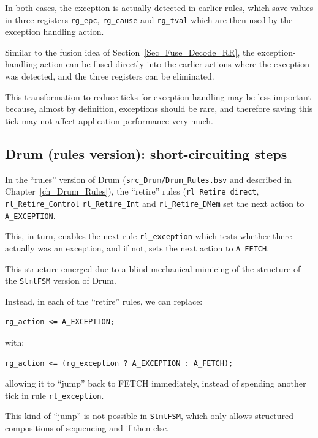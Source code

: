 In both cases, the exception is actually detected in earlier rules,
which save values in three registers \verb|rg_epc|, \verb|rg_cause|
and \verb|rg_tval| which are then used by the exception handling
action.

Similar to the fusion idea of Section~\ref{Sec_Fuse_Decode_RR}, the
exception-handling action can be fused directly into the earlier
actions where the exception was detected, and the three registers can
be eliminated.

This transformation to reduce ticks for exception-handling may be less
important because, almost by definition, exceptions should be rare,
and therefore saving this tick may not affect application performance
very much.


\subsection{Drum (rules version): short-circuiting steps}

In the ``rules'' version of Drum (\verb|src_Drum/Drum_Rules.bsv| and
described in Chapter~\ref{ch_Drum_Rules}), the ``retire'' rules
(\verb|rl_Retire_direct|, \verb|rl_Retire_Control|
\verb|rl_Retire_Int| and \verb|rl_Retire_DMem| set the next action to
\verb|A_EXCEPTION|.

This, in turn, enables the next rule \verb|rl_exception| which tests
whether there actually was an exception, and if not, sets the next
action to \verb|A_FETCH|.

This structure emerged due to a blind mechanical mimicing of the
structure of the \verb|StmtFSM| version of Drum.

Instead, in each of the ``retire'' rules, we can replace:

{\small
\begin{Verbatim}[frame=single]
      rg_action <= A_EXCEPTION;
\end{Verbatim}
}

with:

{\small
\begin{Verbatim}[frame=single]
      rg_action <= (rg_exception ? A_EXCEPTION : A_FETCH);
\end{Verbatim}
}

allowing it to ``jump'' back to FETCH immediately, instead of spending
another tick in rule \verb|rl_exception|.

This kind of ``jump'' is not possible in \verb|StmtFSM|, which only
allows structured compositions of sequencing and if-then-else.

